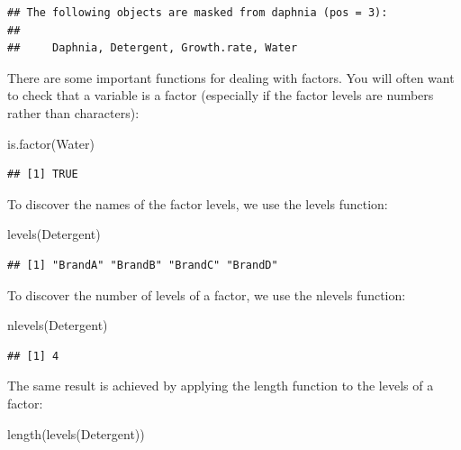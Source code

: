 \documentclass[
]{book}
\newenvironment{Shaded}{\begin{snugshade}}{\end{snugshade}}
\newcommand{\FunctionTok}[1]{\textcolor[rgb]{0.00,0.00,0.00}{#1}}
\newcommand{\NormalTok}[1]{#1}
\begin{document}
\begin{verbatim}
## The following objects are masked from daphnia (pos = 3):
## 
##     Daphnia, Detergent, Growth.rate, Water
\end{verbatim}

There are some important functions for dealing with factors. You will often want to check that a variable is a factor (especially if the factor levels are numbers rather than characters):

\begin{Shaded}
\begin{Highlighting}[]
\FunctionTok{is.factor}\NormalTok{(Water)}
\end{Highlighting}
\end{Shaded}

\begin{verbatim}
## [1] TRUE
\end{verbatim}

To discover the names of the factor levels, we use the levels function:

\begin{Shaded}
\begin{Highlighting}[]
\FunctionTok{levels}\NormalTok{(Detergent)}
\end{Highlighting}
\end{Shaded}

\begin{verbatim}
## [1] "BrandA" "BrandB" "BrandC" "BrandD"
\end{verbatim}

To discover the number of levels of a factor, we use the nlevels function:

\begin{Shaded}
\begin{Highlighting}[]
\FunctionTok{nlevels}\NormalTok{(Detergent)}
\end{Highlighting}
\end{Shaded}

\begin{verbatim}
## [1] 4
\end{verbatim}

The same result is achieved by applying the length function to the levels of a factor:

\begin{Shaded}
\begin{Highlighting}[]
\FunctionTok{length}\NormalTok{(}\FunctionTok{levels}\NormalTok{(Detergent))}
\end{Highlighting}
\end{Shaded}
\end{document}
